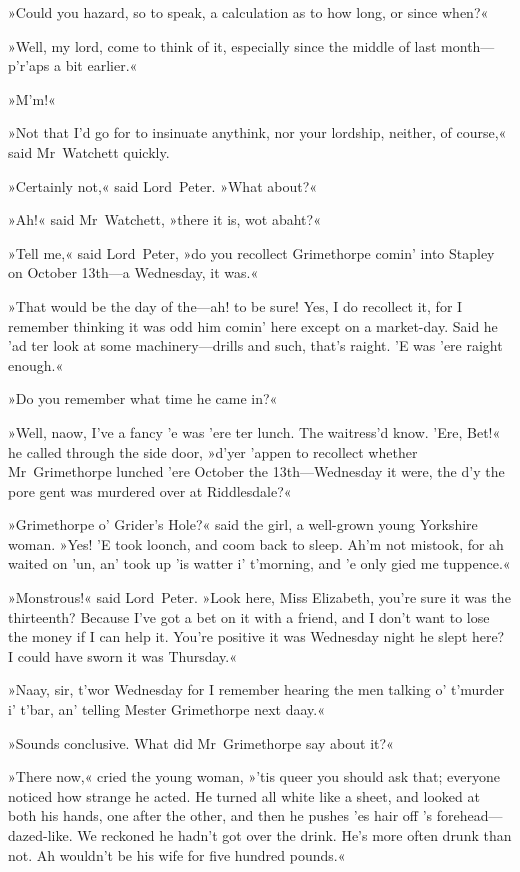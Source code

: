 »Could you hazard, so to speak, a calculation as to how long, or since when?«

»Well, my lord, come to think of it, especially since the middle of last month—p'r'aps a bit earlier.«

»M'm!«

»Not that I'd go for to insinuate anythink, nor your lordship, neither, of course,« said Mr~Watchett quickly.

»Certainly not,« said Lord~Peter. »What about?«

»Ah!« said Mr~Watchett, »there it is, wot abaht?«

»Tell me,« said Lord~Peter, »do you recollect Grimethorpe comin' into Stapley on October 13th—a Wednesday, it was.«

»That would be the day of the—ah! to be sure! Yes, I do recollect it, for I remember thinking it was odd him comin' here except on a market-day. Said he 'ad ter look at some machinery—drills and such, that's raight. 'E was 'ere raight enough.«

»Do you remember what time he came in?«

»Well, naow, I've a fancy 'e was 'ere ter lunch. The waitress'd know. 'Ere, Bet!« he called through the side door, »d'yer 'appen to recollect whether Mr~Grimethorpe lunched 'ere October the 13th—Wednesday it were, the d'y the pore gent was murdered over at Riddlesdale?«

»Grimethorpe o' Grider's Hole?« said the girl, a well-grown young Yorkshire woman. »Yes! 'E took loonch, and coom back to sleep. Ah'm not mistook, for ah waited on 'un, an' took up 'is watter i' t'morning, and 'e only gied me tuppence.«

»Monstrous!« said Lord~Peter. »Look here, Miss Elizabeth, you're sure it was the thirteenth? Because I've got a bet on it with a friend, and I don't want to lose the money if I can help it. You're positive it was Wednesday night he slept here? I could have sworn it was Thursday.«

»Naay, sir, t'wor Wednesday for I remember hearing the men talking o' t'murder i' t'bar, an' telling Mester Grimethorpe next daay.«

»Sounds conclusive. What did Mr~Grimethorpe say about it?«

»There now,« cried the young woman, »'tis queer you should ask that; everyone noticed how strange he acted. He turned all white like a sheet, and looked at both his hands, one after the other, and then he pushes 'es hair off 's forehead—dazed-like. We reckoned he hadn't got over the drink. He's more often drunk than not. Ah wouldn't be his wife for five hundred pounds.«

